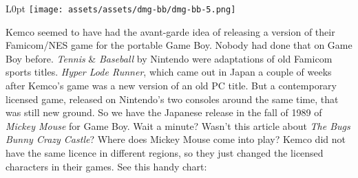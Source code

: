 \documentclass{book}
\begin{document}
\begin{wrapfigure}{L}{0pt} \texttt{[image: assets/assets/dmg-bb/dmg-bb-5.png]}\end{wrapfigure}
Kemco seemed to have had the avant-garde idea of releasing a version of their Famicom/NES game for the portable Game Boy. Nobody had done that on Game Boy before. \emph{Tennis} \& \emph{Baseball} by Nintendo were adaptations of old Famicom sports titles. \emph{Hyper Lode Runner}, which came out in Japan a couple of weeks after Kemco’s game was a new version of an old PC title. But a contemporary licensed game, released on Nintendo’s two consoles around the same time, that was still new ground. So we have the Japanese release in the fall of 1989 of \emph{Mickey Mouse} for Game Boy. Wait a minute? Wasn’t this article about \emph{The Bugs Bunny Crazy Castle}? Where does Mickey Mouse come into play? Kemco did not have the same licence in different regions, so they just changed the licensed characters in their games. See this handy chart:
\end{document}
